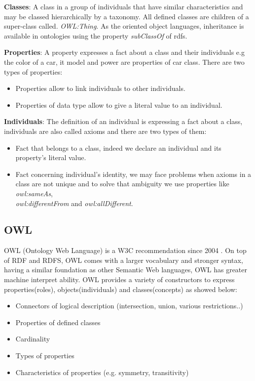 \textbf{Classes}: A class in a group of individuals that have similar characteristics and may be classed hierarchically by a taxonomy.
All defined classes are children of a super-class called. \textit{OWL:Thing}. As the oriented object languages, inheritance is available in ontologies using the property \textit{subClassOf} of rdfs.

\textbf{Properties}: A property expresses a fact about a class and their individuals e.g the color of a car, it model and power are properties of car class.
There are two types of properties:\begin{itemize}
\item Properties allow to link individuals to other individuals.
\item Properties of data type allow to give a literal value to an individual.
\end{itemize}

\textbf{Individuals}: The definition of an individual is expressing a fact about a class, individuals are also called axioms and there are two types of them:\begin{itemize}
\item Fact that belongs to a class, indeed we declare an individual and its property's literal value.
\item Fact concerning individual's identity, we may face problems when axioms in a class are not unique and to solve that ambiguity we use properties like \textit{owl:sameAs},\\             \textit{owl:differentFrom} and \textit{owl:allDifferent}.
\end{itemize}

\subsection{OWL}
OWL (Ontology Web Language) \cite{OWL} is a W3C recommendation since 2004 . On top of RDF and RDFS, OWL comes with a larger vocabulary and stronger syntax, having a similar foundation as other Semantic Web languages, OWL has greater machine interpret ability. OWL provides a variety of constructors to express properties(roles), objects(individuals) and classes(concepts) as showed below:  \begin{itemize}
    \item Connectors of logical description (intersection, union, various restrictions..)
    \item Properties of defined classes
    \item Cardinality
    \item Types of properties
    \item Characteristics of properties (e.g. symmetry, transitivity)
\end{itemize}

